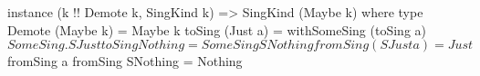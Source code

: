\begin{code}
instance (k !\tyeq! Demote k, SingKind k)
      => SingKind (Maybe k) where
  type Demote (Maybe k) = Maybe k
  toSing (Just a) =
    withSomeSing (toSing a) $ SomeSing . SJust
  toSing Nothing = SomeSing SNothing
  fromSing (SJust a) = Just $ fromSing a
  fromSing SNothing = Nothing
\end{code}
